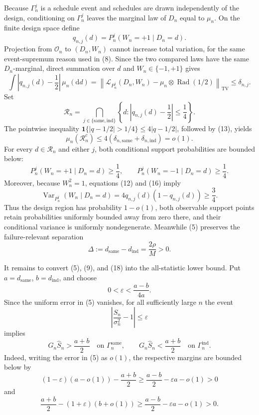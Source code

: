 Because \(\Gamma_n^j\) is a schedule event and schedules are drawn independently of the design, conditioning on \(\Gamma_n^j\) leaves the marginal law of \(D_n\) equal to \(\mu_n\). On the finite design space define
\[
q_{n,j}(d)=P_n^j(W_n=+1\mid D_n=d).
\tag{12}
\]
Projection from \(\mathcal O_n\) to \((D_n,W_n)\) cannot increase total variation, for the same event-supremum reason used in (8). Since the two compared laws have the same \(D_n\)-marginal, direct summation over \(d\) and \(W_n\in\{-1,+1\}\) gives
\[
\int\left|q_{n,j}(d)-\frac12\right|\,\mu_n(\mathrm d d)
=\left\lVert
\mathcal L_{P_n^j}(D_n,W_n)-\mu_n\otimes\operatorname{Rad}(1/2)
\right\rVert_{\mathrm{TV}}
\le\delta_{n,j}.
\tag{13}
\]
Set
\[
\mathcal R_n=
\bigcap_{j\in\{\mathrm{same},\mathrm{ind}\}}
\left\{d:\left|q_{n,j}(d)-\frac12\right|\le\frac14\right\}.
\tag{14}
\]
The pointwise inequality
\(\mathbf 1\{|q-1/2|>1/4\}\le4|q-1/2|\), followed by (13), yields
\[
\mu_n(\mathcal R_n^c)
\le4(\delta_{n,\mathrm{same}}+\delta_{n,\mathrm{ind}})=o(1).
\tag{15}
\]
For every \(d\in\mathcal R_n\) and either \(j\), both conditional support probabilities are bounded below:
\[
P_n^j(W_n=+1\mid D_n=d)\ge\frac14,
\qquad
P_n^j(W_n=-1\mid D_n=d)\ge\frac14.
\tag{16}
\]
Moreover, because \(W_n^2=1\), equations (12) and (16) imply
\[
\operatorname{Var}_{P_n^j}(W_n\mid D_n=d)
=4q_{n,j}(d)(1-q_{n,j}(d))
\ge\frac34.
\tag{17}
\]
Thus the design region has probability \(1-o(1)\), both observable support points retain probabilities uniformly bounded away from zero there, and their conditional variance is uniformly nondegenerate. Meanwhile (5) preserves the failure-relevant separation
\[
\Delta:=d_{\mathrm{same}}-d_{\mathrm{ind}}=\frac{2\rho}{M}>0.
\tag{18}
\]

It remains to convert (5), (9), and (18) into the all-statistic lower bound. Put \(a=d_{\mathrm{same}}\), \(b=d_{\mathrm{ind}}\), and choose
\[
0<\varepsilon<\frac{a-b}{4a}.
\tag{19}
\]
Since the uniform error in (5) vanishes, for all sufficiently large \(n\) the event
\[
\left|\frac{\widehat S_n}{\sigma_n^2}-1\right|\le\varepsilon
\tag{20}
\]
implies
\[
G_n\widehat S_n>\frac{a+b}{2}
\quad\text{on }\Gamma_n^{\mathrm{same}},
\qquad
G_n\widehat S_n<\frac{a+b}{2}
\quad\text{on }\Gamma_n^{\mathrm{ind}}.
\tag{21}
\]
Indeed, writing the error in (5) as \(o(1)\), the respective margins are bounded below by
\[
(1-\varepsilon)(a-o(1))-\frac{a+b}{2}
\ge\frac{a-b}{2}-\varepsilon a-o(1)>0
\tag{22}
\]
and
\[
\frac{a+b}{2}-(1+\varepsilon)(b+o(1))
\ge\frac{a-b}{2}-\varepsilon a-o(1)>0.
\tag{23}
\]


